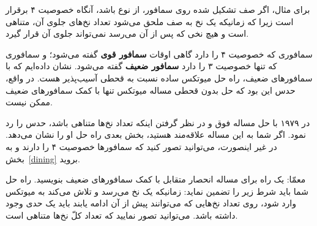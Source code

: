 \documentclass{book}
\begin{document}
    برای مثال، اگر صف تشکیل شده روی سمافور، از نوع   باشد،
    آنگاه خصوصیت ۴ برقرار است زیرا که زمانیکه یک نخ به صف ملحق می‌شود تعداد نخ‌های جلوی آن، متناهی است و هیچ نخی که پس از آن می‌رسد 
    نمی‌تواند جلوی آن قرار گیرد. 

    سمافوری که خصوصیت ۴ را دارد گاهی اوقات \textbf{سمافور قوی} گفته می‌شود؛ و 
    سمافوری که تنها خصوصیت ۳ را دارد \textbf{سمافور ضعیف} گفته می‌شود.
    نشان‌ داده‌ایم که  با سمافورهای ضعیف، راه حل میوتکس ساده نسبت به قحطی آسیب‌پذیر هست.
    در واقع، حدس  این بود که حل بدون قحطی مساله میوتکس تنها با کمک سمافورهای ضعیف ممکن نیست. 

    در ۱۹۷۹  با حل مساله فوق و در نظر گرفتن اینکه تعداد نخ‌ها متناهی باشد، حدس    را رد نمود\cite{morris}. 
    اگر شما به این مساله علاقه‌مند هستید، بخش بعدی راه حل او را نشان می‌دهد. در غیر اینصورت، می‌توانید تصور کنید که سمافورها خصوصیت ۴ 
    را دارند و به بخش~\ref{dining} بروید. 

    معمّا: یک راه برای مساله انحصار متقابل با کمک سمافورهای ضعیف بنویسید. راه حل شما باید شرط زیر را تضمین نماید: 
    زمانیکه یک نخ می‌رسد و تلاش می‌کند به میوتکس وارد شود،  روی تعداد نخ‌هایی که می‌توانند پیش از آن ادامه یابند باید یک حدی وجود داشته باشد. 
    می‌توانید تصور نمایید که تعداد کلّ نخ‌ها متناهی است. 
\end{document}
